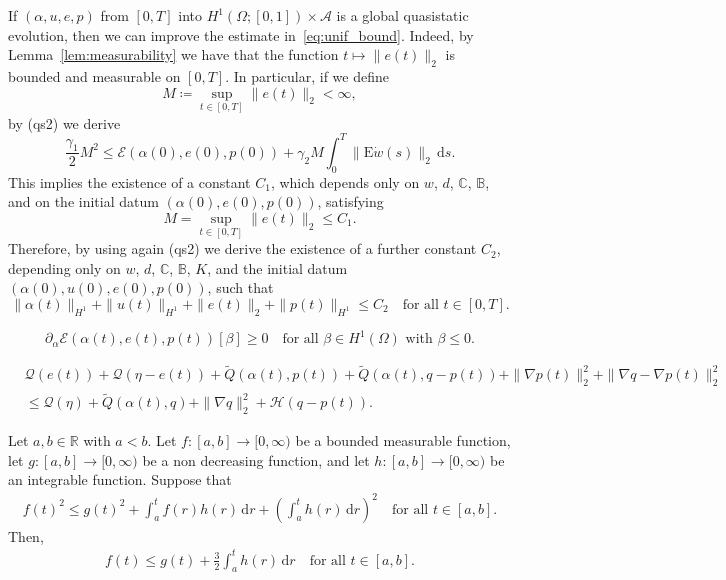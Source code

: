 \documentclass[10pt,a4paper]{amsart}
\def\B {\mathbb B}
\def\C {\mathbb C}
\def\EE {\mathrm{E}}
\def\R {\mathbb R}
\def\de {\mathrm{d}}
\begin{document}
\begin{remark}\label{rem:unif_bound}
If $(\alpha,u,e,p)$ from $[0,T]$ into $H^1(\Omega;[0,1])\times \mathcal A$ is a global quasistatic evolution, then we can improve the estimate in~\eqref{eq:unif_bound}. Indeed, by Lemma~\ref{lem:measurability} we have that the function $t\mapsto \|e(t)\|_2$ is bounded and measurable on $[0,T]$. In particular, if we define 
$$M\coloneqq\sup_{t\in[0,T]}\|e(t)\|_2<\infty,$$
by (qs2) we derive
$$\frac{\gamma_1}{2}M^2\le \mathcal E(\alpha(0),e(0),p(0))+\gamma_2 M\int_0^T\|\EE \dot w(s)\|_2\,\de s.$$
This implies the existence of a constant $C_1$, which depends only on $w$, $d$, $\C$, $\B$, and on the initial datum $(\alpha(0),e(0),p(0))$, satisfying
$$M=\sup_{t\in[0,T]}\|e(t)\|_2\le C_1.$$
Therefore, by using again (qs2) we derive the existence of a further constant $C_2$, depending only on $w$, $d$, $\C$, $\B$, $K$, and the initial datum $(\alpha(0),u(0),e(0),p(0))$, such that
\begin{equation*}
\|\alpha(t)\|_{H^1}+\|u(t)\|_{H^1}+\|e(t)\|_2+\|p(t)\|_{H^1}\le C_2\quad\text{for all $t\in[0,T]$}.
\end{equation*}     
\end{remark}

\begin{equation}\label{eq:st_1}
\partial_\alpha \mathcal E(\alpha(t),e(t),p(t))[\beta]\ge 0\quad\text{for all $\beta\in H^1(\Omega)$ with $\beta\le 0$}.
\end{equation}

\begin{align}
&\mathcal Q(e(t))+\mathcal Q(\eta-e(t))+\tilde Q(\alpha(t),p(t))+\tilde Q(\alpha(t),q-p(t))+\|\nabla p(t)\|_2^2+\|\nabla q-\nabla p(t)\|_2^2\nonumber\\
&\le \mathcal Q(\eta)+\tilde Q(\alpha(t),q)+\|\nabla q\|_2^2+\mathcal H(q-p(t)).\label{eq:st_3}
\end{align}

\begin{lemma}\label{lem:gronw}
Let $a,b\in\R$ with $a<b$. Let $f\colon [a,b]\to [0,\infty)$ be a bounded measurable function, let $g\colon [a,b]\to [0,\infty)$ be a non decreasing function, and let $h\colon [a,b]\to [0,\infty)$ be an integrable function. Suppose that
\begin{align}\label{eq:gronw1}
f(t)^2\le g(t)^2+\int_a^tf(r)h(r)\,\de r+\left(\int_a^t h(r)\,\de r\right)^2\quad\text{for all $t\in[a,b]$}.
\end{align}
Then, 
\begin{align}\label{eq:gronw2}
f(t)\le g(t)+\frac{3}{2}\int_a^th(r)\,\de r\quad\text{for all $t\in[a,b]$}.    
\end{align}
\end{lemma}
\end{document}
